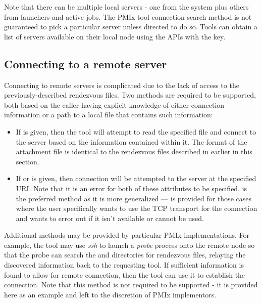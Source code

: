 Note that there can be multiple local servers - one from the system plus others from launchers and active jobs. The \ac{PMIx} tool connection search method is not guaranteed to pick a particular server unless directed to do so. Tools can obtain a list of servers available on their local node using the  \acp{API} with the  key.

\subsection{Connecting to a remote server}

Connecting to remote servers is complicated due to the lack of access to the previously-described rendezvous files. Two methods are required to be supported, both based on the caller having explicit knowledge of either connection information or a path to a local file that contains such information:

\begin{itemize}
%
\item If  is given, then the tool will attempt to read the specified file and connect to the server based on the information contained within it. The format of the attachment file is identical to the rendezvous files described in earlier in this section.
%
\item If  or  is given, then connection will be attempted to the server at the specified \ac{URI}. Note that it is an error for both of these attributes to be specified.  is the preferred method as it is more generalized —  is provided for those cases where the user specifically wants to use the \ac{TCP} transport for the connection and wants to error out if it isn’t available or cannot be used.
%
\end{itemize}

Additional methods may be provided by particular \ac{PMIx} implementations. For example, the tool may use \emph{ssh} to launch a \emph{probe} process onto the remote node so that the probe can search the  and  directories for rendezvous files, relaying the discovered information back to the requesting tool. If sufficient information is found to allow for remote connection, then the tool can use it to establish the connection. Note that this method is not required to be supported - it is provided here as an example and left to the discretion of \ac{PMIx} implementors.

